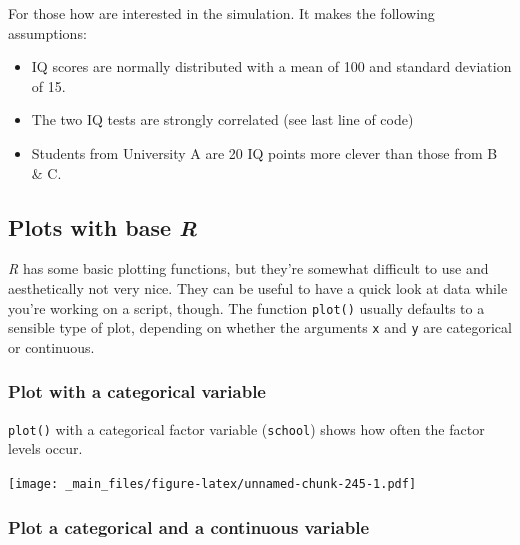 \documentclass[
]{scrartcl}
\makeatletter
\newenvironment{Shaded}{\begin{snugshade}}{\end{snugshade}}
\newcommand{\AttributeTok}[1]{\textcolor[rgb]{0.13,0.29,0.53}{#1}}
\newcommand{\FunctionTok}[1]{\textcolor[rgb]{0.13,0.29,0.53}{\textbf{#1}}}
\newcommand{\NormalTok}[1]{#1}
\newcommand{\SpecialCharTok}[1]{\textcolor[rgb]{0.81,0.36,0.00}{\textbf{#1}}}
\providecommand{\tightlist}{%
  \setlength{\itemsep}{0pt}\setlength{\parskip}{0pt}}
\newenvironment{kframe}{%
\medskip{}
\setlength{\fboxsep}{.8em}
 \def\at@end@of@kframe{}%
 \ifinner\ifhmode%
  \def\at@end@of@kframe{\end{minipage}}%
  \begin{minipage}{\columnwidth}%
 \fi\fi%
 \def\FrameCommand##1{\hskip\@totalleftmargin \hskip-\fboxsep
 \colorbox{shadecolor}{##1}\hskip-\fboxsep
     \hskip-\linewidth \hskip-\@totalleftmargin \hskip\columnwidth}%
 \MakeFramed {\advance\hsize-\width
   \@totalleftmargin\z@ \linewidth\hsize
   \@setminipage}}%
 {\par\unskip\endMakeFramed%
 \at@end@of@kframe}
\newenvironment{rmdblock}[1]
  {
  \begin{itemize}
  \renewcommand{\labelitemi}{
    \raisebox{-.7\height}[0pt][0pt]{
      {\setkeys{Gin}{width=3em,keepaspectratio}\texttt{[image: images/\#1]}}
    }
  }
  \setlength{\fboxsep}{1em}
  \begin{kframe}
  \item
  }
  {
  \end{kframe}
  \end{itemize}
  }
\newenvironment{geek}
    {\begin{rmdblock}{geek}}
    {\end{rmdblock}}
\makeatother
\begin{document}
\begin{geek}
For those how are interested in the simulation. It makes the following
assumptions:

\begin{itemize}
\tightlist
\item
  IQ scores are normally distributed with a mean of 100 and standard
  deviation of 15.
\item
  The two IQ tests are strongly correlated (see last line of code)
\item
  Students from University A are 20 IQ points more clever than those
  from B \& C.
\end{itemize}
\end{geek}

\hypertarget{plots-with-base-r}{%
\subsection{\texorpdfstring{Plots with base \emph{R}}{Plots with base R}}\label{plots-with-base-r}}

\emph{R} has some basic plotting functions, but they're somewhat difficult to use and aesthetically not very nice. They can be useful to have a quick look at data while you're working on a script, though. The function \texttt{plot()} usually defaults to a sensible type of plot, depending on whether the arguments \texttt{x} and \texttt{y} are categorical or continuous.

\hypertarget{plot-with-a-categorical-variable}{%
\subsubsection{Plot with a categorical variable}\label{plot-with-a-categorical-variable}}

\texttt{plot()} with a categorical factor variable (\texttt{school}) shows how often the factor levels occur.

\begin{Shaded}
\end{Shaded}

\texttt{[image: \_main\_files/figure-latex/unnamed-chunk-245-1.pdf]}

\hypertarget{plot-a-categorical-and-a-continuous-variable}{%
\subsubsection{Plot a categorical and a continuous variable}\label{plot-a-categorical-and-a-continuous-variable}}
\end{document}
